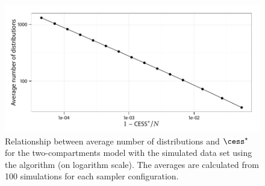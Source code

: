 \begin{figure}[t]
  \UseAltLinespread
  \includegraphics[width=\linewidth]{fig_src/CESS_Iter_Mean}
  \caption[Relationship between average number of distributions and
  \protect\cess]
  {Relationship between average number of distributions and $\cess^\star$ for the two-compartments \pet model with the simulated data set using the \smc[2] algorithm (on logarithm scale). The averages are calculated from 100 simulations for each sampler configuration.}
  \label{fig:cess iter mean}
\end{figure}
